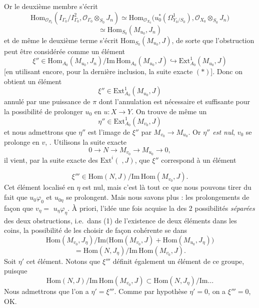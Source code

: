 \documentclass[11pt,a4paper]{article}
\begin{document}


Or le  deuxième membre s'écrit
\[
\mathrm{Hom}_{\mathcal{O}_{P_0}}(I_{\Gamma_0}/I_{\Gamma_0}^2,\mathcal{O}_{\Gamma_0}\otimes_{S_0}J_n)\simeq\mathrm{Hom}_{\mathcal{O}_{X_0}}\bigl(u_0^*(\Omega^1_{Y_0/S_0}),\mathcal{O}_{X_0}\otimes_{S_0}J_n\bigr)
\]
\[
\simeq\mathrm{Hom}_{S_0}(M_{u_0},J_n)
\]
et de même \struck{\ill{}} le deuxième terme s'écrit $\mathrm{Hom}_{S_0}(M_{u_0},J)$, de sorte que l'obstruction peut être considérée comme un élément
\[
\xi''\in\mathrm{Hom}_{A_0}(M_{u_0},J_n)/\mathrm{Im}\,\mathrm{Hom}_{A_0}(M_{u_0},J)\hookrightarrow\mathrm{Ext}^1_{A_0}(M_{u_0},J)
\]
[en utilisant encore, pour la dernière inclusion, la suite exacte $(\ast)$]. Donc on obtient un élément
\[
\xi''\in\mathrm{Ext}^1_{A_0}(M_{u_0},J)
\]
annulé par une puissance de $\pi$ dont l'annulation est nécessaire et suffisante pour la possibilité de prolonger $u_0$ en $u\colon X\to Y$. On trouve de même un
\[
\eta''\in\mathrm{Ext}^1_{A_0}(M_{v_0},J)
\]
et nous admettrons que $\eta''$ est l'image de $\xi''$ par $M_{v_0}\to M_{u_0}$. Or \emph{$\eta''$ est nul},  $v_0$ se prolonge en $v$, . Utilisons la suite exacte
\[
0\to N\to M_{v_0}\to M_{u_0}\to 0,
\]
il vient, par la suite exacte des $\mathrm{Ext}^i(\;,J)$, que $\xi''$ correspond à un élément


\[
\xi'''\in\mathrm{Hom}(N,J)/\mathrm{Im}\,\mathrm{Hom}(M_{v_0},J).
\]
 Cet élément localisé en $\eta$ est nul, \struck{\ill{}} mais c'est là tout ce que nous pouvons tirer du fait que $u_0\varphi_0$ et $u_{0\eta}$ se prolongent. Mais nous savons plus : les prolongements   de façon que $v_\eta=$ \struck{$\varphi_\eta$} $u_\eta\varphi_\eta$. À priori, l'idée une fois acquise la  des 2 possibilités \emph{séparées} des deux obstructions, i.e.\ dans (1) de l'existence de deux éléments dans les coins,  la possibilité de les choisir de façon cohérente se  dans
\[
\mathrm{Hom}(M_{v_0},J_\eta)/\mathrm{Im}\bigl(\mathrm{Hom}(M_{v_0},J)+\mathrm{Hom}(M_{u_0},J_\eta)\bigr)
\]
\[
=\mathrm{Hom}(N,J_\eta)/\mathrm{Im}\,\mathrm{Hom}(M_{v_0},J).
\]
Soit $\eta'$ cet élément. Notons que $\xi'''$ définit également un élément de ce groupe, puisque
\[
\mathrm{Hom}(N,J)/\mathrm{Im}\,\mathrm{Hom}(M_{v_0},J)\subset\mathrm{Hom}(N,J_\eta)/\mathrm{Im}\ldots
\]
Nous admettrons que l'on a $\eta'=\xi'''$. Comme par hypothèse $\eta'=0$, on a $\xi'''=0$, OK.
\end{document}
